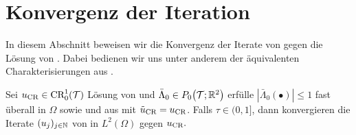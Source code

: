 \section{Konvergenz der Iteration}
In diesem Abschnitt beweisen wir die Konvergenz der Iterate von
 gegen die Lösung von
. 
Dabei bedienen wir uns unter anderem der äquivalenten Charakterisierungen aus
.

\begin{theorem}
  \label{thm:convergenceIteration}
  Sei $u_\textup{CR}\in \textup{CR}^1_0(\mathcal{T})$ Lösung von  und
  $\bar\Lambda_0\in P_0\!\left(\mathcal{T};\mathbb{R}^2\right)$ erfülle
  $\left|\bar\Lambda_0(\bullet)\right|\leq 1$ fast überall in $\Omega$ sowie
   und
   aus
   mit
  $\tilde{u}_{\textup{CR}}=u_\textup{CR}$.
  Falls $\tau \in (0, 1]$, dann konvergieren die Iterate $(u_j)_{j\in\mathbb{N}}$ von
   in $L^2(\Omega)$ gegen $u_\textup{CR}.$
\end{theorem}

